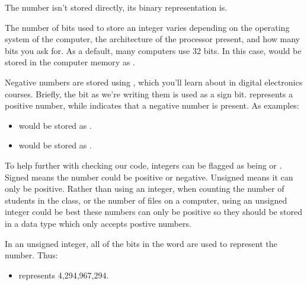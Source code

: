 \documentclass[letterpaper,10pt,british]{sphinxmanual}
\begin{document}
\sphinxAtStartPar
The number  isn’t stored directly, its binary representation is.

\sphinxAtStartPar
The number of bits used to store an integer varies depending on the operating system of the computer, the architecture of the processor present, and how many bits you ask for. As a default, many computers use 32 bits. In this case,  would be stored in the computer memory as .

\sphinxAtStartPar
Negative numbers are stored using , which you’ll learn about in digital electronics courses. Briefly, the  bit as we’re writing them is used as a sign bit.  represents a positive number, while  indicates that a negative number is present. As examples:
\begin{itemize}
\item {} 
\sphinxAtStartPar
{} would be stored as .

\item {} 
\sphinxAtStartPar
{} would be stored as .\textasciigrave{}

\end{itemize}

\sphinxAtStartPar
To help further with checking our code, integers can be flagged as being  or . Signed means the number could be positive or negative. Unsigned means it can only be positive. Rather than using an integer, when counting the number of students in the class, or the number of files on a computer, using an unsigned integer could be best \sphinxhyphen{} these numbers can only be positive so they should be stored in a data type which only accepts postive numbers.

\sphinxAtStartPar
In an unsigned integer, all of the bits in the word are used to represent the number. Thus:
\begin{itemize}
\item {} 
\sphinxAtStartPar
{} represents 4,294,967,294.

\end{itemize}
\end{document}
